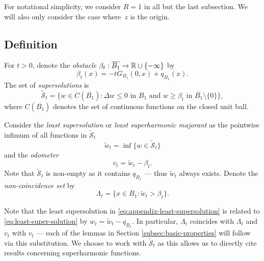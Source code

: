 \documentclass[12pt]{amsart}
\numberwithin{equation}{section}
\newcommand{\mclSshift}[2]{\hyperref[eq:shifted-supersolutions]{\mathcal{\tilde{S}}^{#1}_{#2}}}
\newcommand{\lss}[2]{\hyperref[eq:least-super-solution]{w^{#1}_{#2}}}
\newcommand{\lssshift}[2]{\hyperref[eq:appendix-least-supersolution]{\tilde{w}^{#1}_{#2}}}
\newcommand{\cluster}[2]{\hyperref[eq:non-co-set]{\mathit{\Lambda}^{#1}_{#2}}}
\newcommand{\odometer}[2]{\hyperref[eq:limit-odometer]{v^{#1}_{#2}}}
\begin{document}
	For notational simplicity, we consider $R = 1$ in all but the last subsection. We will also only consider the case where~$z$ is the origin.
	
	\subsection{Definition} \label{subsec:obstacle-problem}
	For $t > 0$, denote the {\it obstacle} $\beta_t: \overline{B_1} \to \mathbb{R} \cup \{-\infty\}$ by 
	\begin{equation} \label{eq:obstacle}
	\beta_t(x) = -t G_{B_1}(0,x) + q_{B_1}(x).
	\end{equation}
	The set of {\it supersolutions}
	is
	\begin{equation} \label{eq:shifted-supersolutions}
	\mclSshift{}{t} = \{ w \in C(\overline{B_1}) :  \Delta w \leq 0 \mbox{ in $B_1$}  \mbox{ and }  w \geq \beta_t \mbox{ in $\overline{B_1}\setminus\{0\}$}\},
	\end{equation}
	where $C(\overline{B_1})$ denotes the set of continuous functions on the closed unit ball.
	
	Consider the {\it least supersolution} or {\it least superharmonic majorant} 
	as the pointwise infimum of all functions in $\mclSshift{}{t}$
	\begin{equation} \label{eq:appendix-least-supersolution}
	\lssshift{}{t} = \inf\{ w \in \mclSshift{}{t} \} 
	\end{equation}
	and the {\it odometer}
	\begin{equation} \label{eq:appendix-limit-odometer}
	v_t = \lssshift{}{t}  - \beta_t.
	\end{equation}
	Note that $\mclSshift{}{t}$ is non-empty as it contains $q_{B_1}$ --- thus $\lssshift{}{t}$ always exists.
	Denote the {\it non-coincidence set} by
	\begin{equation} \label{eq:appendix-non-co-set}
	\mathit{\Lambda_t} = \{ x \in B_1 : \lssshift{}{t} > \beta_t \}.
	\end{equation}
	
	Note that the least supersolution in \eqref{eq:appendix-least-supersolution} is related
	to \eqref{eq:least-super-solution} by $\lss{}{t}= \lssshift{}{t} - q_{B_1}$. In particular, $\mathit{\Lambda_t}$
	coincides with ${\cluster{}{t}}$ and $v_t$ with $\odometer{}{t}$  --- each of the lemmas in Section \ref{subsec:basic-properties} will follow via this substitution.
	We choose to work with $\mclSshift{}{t}$ as this allows us to directly cite results concerning superharmonic functions.
	
\end{document}
